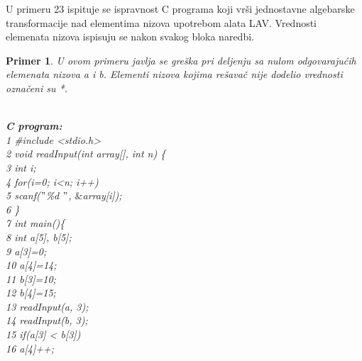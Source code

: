 \documentclass[12pt,oneside]{memoir}
\newcommand\tab[1][0.5cm]{\hspace*{#1}}
\newtheorem{primer}{Primer}
\begin{document}
U primeru 23 ispituje se ispravnost C programa koji vrši jednostavne algebarske transformacije nad elementima nizova upotrebom alata LAV. Vrednosti elemenata nizova ispisuju se nakon svakog bloka naredbi.
\begin{primer}
U ovom primeru javlja se greška pri deljenju sa nulom odgovarajućih elemenata nizova a i b. Elementi nizova kojima rešavač nije dodelio vrednosti označeni su *.\\ \\
\hspace{-0.6cm} \label{example23}
\begin{minipage}[b]{0.5\textwidth}
\textbf{C program:}\\
1 \hspace{0.1cm} \#include <stdio.h> \\
2 \hspace{0.1cm} void readInput(int array[], int n) \{ \\
3	\hspace{0.15cm} \tab int i; \\
4	\hspace{0.15cm} \tab for(i=0; i<n; i++) \\
5	\hspace{0.15cm} \tab \tab	scanf($"$\%d $"$, $\&$array[i]); \\
6 \hspace{0.1cm} \} \\
7 \hspace{0.1cm} int main()\{ \\
8	\hspace{0.15cm} \tab int a[5], b[5];\\
9	\hspace{0.15cm} \tab a[3]=0; \\
10	\hspace{-0.08cm} \tab a[4]=14; \\
11	\hspace{-0.08cm} \tab b[3]=10; \\
12	\hspace{-0.08cm} \tab b[4]=15; \\
13  \hspace{-0.08cm} \tab readInput(a, 3); \\
14  \hspace{-0.08cm} \tab readInput(b, 3); \\
15  \hspace{-0.08cm} \tab if(a[3] < b[3]) \\
16	\hspace{-0.08cm} \tab \tab	a[4]++; \\

\end{minipage}
\end{primer}
\end{document}
